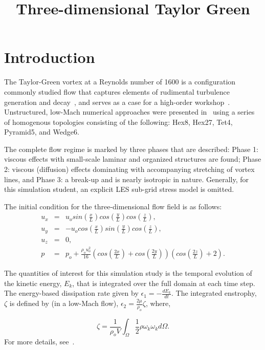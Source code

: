 \documentclass{article}
\title{Three-dimensional Taylor Green}
\date{}
\begin{document}
\maketitle

\section{Introduction}
The Taylor-Green vortex at a Reynolds number of 1600 is a configuration 
commonly studied flow that captures elements of rudimental turbulence generation and 
decay~\cite{taylorGreen}, and serves as a case for a high-order workshop~\cite{hillewaert2012}. 
Unstructured, low-Mach numerical approaches were presented in~\cite{domino2019} using a series of 
homogenous topologies consisting of the following: Hex8, Hex27, Tet4, Pyramid5, and Wedge6.

The complete flow regime is marked by three phases that are described: Phase 1: viscous effects 
with small-scale laminar and organized structures are found; Phase 2: viscous (diffusion) effects 
dominating with accompanying stretching of vortex lines, and Phase 3: a break-up and is nearly 
isotropic in nature. Generally, for this simulation student, an explicit LES sub-grid stress model 
is omitted.  

The initial condition for the three-dimensional flow field is as follows:
%
\begin{eqnarray}
u_x &=& u_o sin(\frac{x}{L})cos(\frac{y}{L})cos(\frac{z}{L}), \nonumber \\
u_y &=& -u_o cos(\frac{x}{L})sin(\frac{y}{L})cos(\frac{z}{L}), \nonumber \\
u_z &=& 0, \nonumber \\
p &=& p_o + \frac{\rho_o u_o^2}{16}\left(cos(\frac{2x}{L}) + cos(\frac{2y}{L})\right)\left(cos(\frac{2z}{L})+2\right).
\end{eqnarray}

The quantities of interest for this simulation study is the temporal evolution of the kinetic energy, $E_k$, that
is integrated over the full domain at each time step. The energy-based dissipation rate 
given by $\epsilon_1 = -\frac{dE_k}{dt}$. 
The integrated enstrophy, $\zeta$ is defined by (in a low-Mach flow), $\epsilon_2 = \frac{2 \mu}{\rho_o} \zeta$,
where,

\begin{equation}
\zeta = \frac{1}{\rho_o V} \int_\Omega \frac{1}{2}\rho \omega_k \omega_k d\Omega.
\end{equation}
%
For more details, see~\cite{bullAndJameson2015}.
\end{document}
